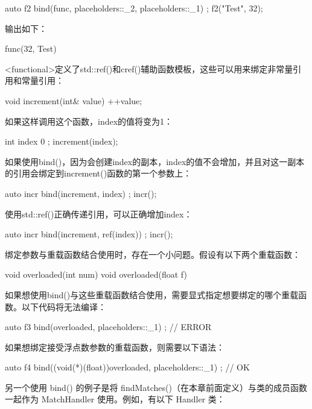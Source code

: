 \begin{cpp}
auto f2 { bind(func, placeholders::_2, placeholders::_1) };
f2("Test", 32);
\end{cpp}

输出如下：

\begin{shell}
func(32, Test)
\end{shell}

<functional>定义了std::ref()和cref()辅助函数模板，这些可以用来绑定非常量引用和常量引用：

\begin{cpp}
void increment(int& value) { ++value; }
\end{cpp}

如果这样调用这个函数，index的值将变为1：

\begin{cpp}
int index { 0 };
increment(index);
\end{cpp}

如果使用bind()，因为会创建index的副本，index的值不会增加，并且对这一副本的引用会绑定到increment()函数的第一个参数上：

\begin{cpp}
auto incr { bind(increment, index) };
incr();
\end{cpp}

使用std::ref()正确传递引用，可以正确增加index：

\begin{cpp}
auto incr { bind(increment, ref(index)) };
incr();
\end{cpp}

绑定参数与重载函数结合使用时，存在一个小问题。假设有以下两个重载函数：

\begin{cpp}
void overloaded(int num) {}
void overloaded(float f) {}
\end{cpp}

如果想使用bind()与这些重载函数结合使用，需要显式指定想要绑定的哪个重载函数。以下代码将无法编译：

\begin{cpp}
auto f3 { bind(overloaded, placeholders::_1) }; // ERROR
\end{cpp}

如果想绑定接受浮点数参数的重载函数，则需要以下语法：

\begin{cpp}
auto f4 { bind((void(*)(float))overloaded, placeholders::_1) }; // OK
\end{cpp}

另一个使用 bind() 的例子是将 findMatches()（在本章前面定义）与类的成员函数一起作为 MatchHandler 使用。例如，有以下 Handler 类：

